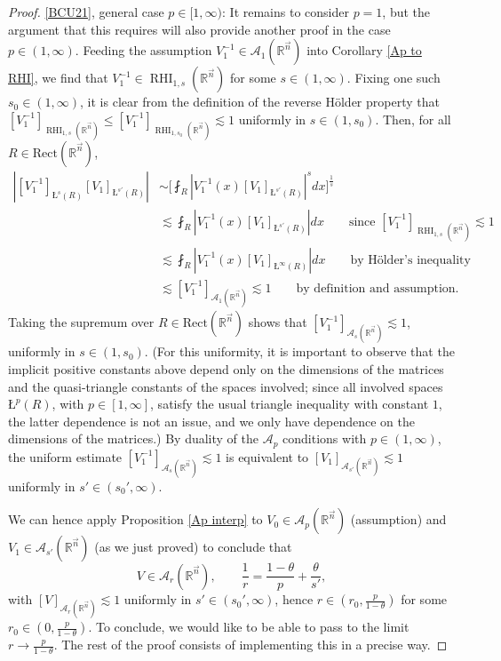 \documentclass[11pt, reqno]{amsart}
\theoremstyle{definition}
\theoremstyle{remark}
\numberwithin{equation}{section}
\newcommand{\A}{\mathscr A}
\newcommand{\R}{\mathbb R}
\newcommand{\vn}{\vec n}
\newcommand{\aveL}{\textit{\L}}
\newcommand{\abs}[1]{|#1|}
\newcommand{\Rect}{\mathrm{Rect}}
\begin{document}
\begin{proof}
\eqref{BCU21}, general case $p\in[1,\infty)$: It remains to consider $p=1$, but the argument that this requires will also provide another proof in the case $p\in(1,\infty)$. Feeding the assumption $V_1^{-1}\in\A_1(\R^{\vn})$ into Corollary \ref{Ap to RHI}, we find that $V_1^{-1}\in\operatorname{RHI}_{1,s}(\R^{\vn})$ for some $s\in(1,\infty)$. Fixing one such $s_0\in(1,\infty)$, it is clear from the definition of the reverse H\"older property that $[V_1^{-1}]_{\operatorname{RHI}_{1,s}(\R^{\vn})}\leq[V_1^{-1}]_{\operatorname{RHI}_{1,s_0}(\R^{\vn})}\lesssim 1$ uniformly in $s\in(1,s_0)$. Then, for all $R\in\Rect(\R^{\vn})$,
\begin{equation*}
\begin{split}
  \abs{[V_1^{-1}]_{\aveL^s(R)}[V_1]_{\aveL^{s'}(R)}}
  &\sim \bigg[ \fint_R\abs{V_1^{-1}(x)[V_1]_{\aveL^{s'}(R)}}^s dx \bigg]^{\frac 1s} \\
  &\lesssim\fint_R\abs{V_1^{-1}(x)[V_1]_{\aveL^{s'}(R)}} dx\qquad\text{since }[V_1^{-1}]_{\operatorname{RHI}_{1,s}(\R^{\vn})}\lesssim 1 \\
  &\lesssim\fint_R\abs{V_1^{-1}(x)[V_1]_{\aveL^{\infty}(R)}} dx\qquad\text{by H\"older's inequality} \\
  &\lesssim [V_1^{-1}]_{\A_1(\R^{\vn})}\lesssim 1\qquad\text{by definition and assumption}.
\end{split}
\end{equation*}
Taking the supremum over $R\in\Rect(\R^{\vn})$ shows that $[V_1^{-1}]_{\A_s(\R^{\vn})}\lesssim 1$, uniformly in $s\in(1,s_0)$. (For this uniformity, it is important to observe that the implicit positive constants above depend only on the dimensions of the matrices and the quasi-triangle constants of the spaces involved; since all involved spaces $\aveL^p(R)$, with $p\in[1,\infty]$, satisfy the usual triangle inequality with constant $1$, the latter dependence is not an issue, and we only have dependence on the dimensions of the matrices.)
By duality of the $\A_p$ conditions with $p\in(1,\infty)$, the uniform estimate $[V_1^{-1}]_{\A_s(\R^{\vn})}\lesssim 1$ is equivalent to $[V_1]_{\A_{s'}(\R^{\vn})}\lesssim 1$ uniformly in $s'\in(s_0',\infty)$.

We can hence apply Proposition \ref{Ap interp} to $V_0\in\A_p(\R^{\vn})$ (assumption) and $V_1\in\A_{s'}(\R^{\vn})$ (as we just proved) to conclude that
\begin{equation}\label{VinAr}
  V\in \A_r(\R^{\vn}),\qquad\frac{1}{r}=\frac{1-\theta}{p}+\frac{\theta}{s'},
\end{equation}
with $[V]_{\A_r(\R^{\vn})}\lesssim 1$ uniformly in $s'\in(s_0',\infty)$, hence $r\in(r_0,\frac{p}{1-\theta})$ for some $r_0\in(0,\frac{p}{1-\theta})$. To conclude, we would like to be able to pass to the limit $r\to\frac{p}{1-\theta}$. The rest of the proof consists of implementing this in a precise way.


\end{proof}
\end{document}
